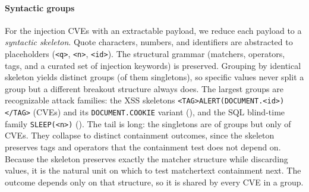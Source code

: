 \paragraph{Syntactic groups}
For the \textbf{\dataPayloadBackedCVEs} injection CVEs with an extractable payload, we
reduce each payload to a \emph{syntactic skeleton}.
Quote characters, numbers, and identifiers are abstracted to placeholders
(\verb|<q>|, \verb|<n>|, \verb|<id>|).
The structural grammar (matchers, operators, tags, and a curated set of
injection keywords) is preserved.
Grouping by identical skeleton yields \textbf{\dataDistinctSkeletons} distinct groups
(\dataSingletonGroups of them singletons), so specific values never split a group but a
different breakout structure always does.
The largest groups are recognizable attack families: the XSS skeletons
\verb|<TAG>ALERT(DOCUMENT.<id>)</TAG>| (\dataGroupAlertDocId CVEs) and its
\verb|DOCUMENT.COOKIE| variant (\dataGroupAlertCookie), and the SQL blind-time
family \verb|SLEEP(<n>)| (\dataGroupSleep).
The tail is long: the singletons are \dataSingletonGroupShare of groups but only \dataSingletonCVEShare of CVEs.
They collapse to \dataSingletonVerdicts distinct containment outcomes, since the skeleton preserves tags and
operators that the containment test does not depend on.
Because the skeleton preserves exactly the matcher structure while discarding
values, it is the natural unit on which to test matchertext containment next.
The outcome depends only on that structure, so it is shared by every CVE in a group.
